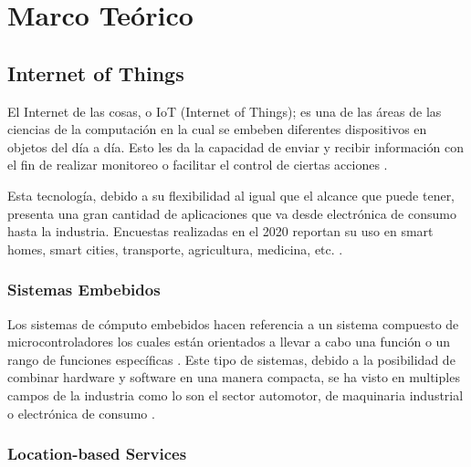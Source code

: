 \section{Marco Teórico}

\subsection{Internet of Things}


El Internet de las cosas, o IoT (Internet of Things); es una de las áreas de las ciencias de la computación en la cual  se embeben diferentes dispositivos en objetos del día a día. Esto les da la capacidad de enviar y recibir información con el fin de realizar monitoreo o facilitar el control de ciertas acciones \cite{Berte_2018}.

Esta tecnología, debido a su flexibilidad al igual que el alcance que puede tener, presenta una gran cantidad de aplicaciones que va desde electrónica de consumo hasta la industria. Encuestas realizadas en el 2020 reportan su uso en smart homes, smart cities, transporte, agricultura, medicina, etc. \cite{Dawood_2020}.

\subsubsection{Sistemas Embebidos}


Los sistemas de cómputo embebidos hacen referencia a un sistema compuesto de microcontroladores los cuales están orientados a llevar a cabo una función o un rango de funciones específicas \cite{heath2002embedded}. Este tipo de sistemas, debido a la posibilidad de combinar hardware y software en una manera compacta, se ha visto en multiples campos de la industria como lo son el sector automotor, de maquinaria industrial o electrónica de consumo \cite{deichmann_2022}.


\subsubsection{Location-based Services}

